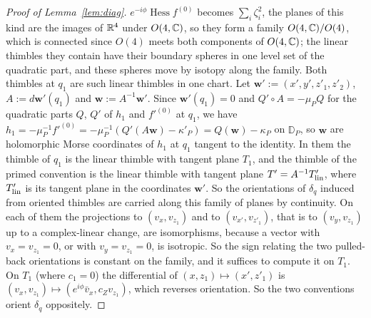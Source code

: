 \begin{proof}[Proof of Lemma~\ref{lem:diag}]
$e^{-i\phi}\operatorname{Hess}f^{(0)}$ becomes $\sum_i\zeta_i^2$, the planes of this kind are the images of $\mathbb R^4$ under
$O(4,\mathbb C)$, so they form a family $O(4,\mathbb C)/O(4)$, which is connected since $O(4)$ meets both components of $O(4,\mathbb C)$; the linear thimbles they contain have their boundary spheres
in one level set of the quadratic part, and these spheres move by isotopy along the family. Both thimbles at $q_1$ are
such linear thimbles in one chart. Let $\mathbf w':=(x',y',z'_1,z'_2)$, $A:=d\mathbf w'(q_1)$ and $\mathbf w:=A^{-1}\mathbf w'$.
Since $\mathbf w'(q_1)=0$ and $Q'\circ A=-\mu_PQ$ for the quadratic parts $Q$, $Q'$ of $h_1$ and $f'^{(0)}$ at $q_1$, we have
$h_1=-\mu_P^{-1}f'^{(0)}=-\mu_P^{-1}(Q'(A\mathbf w)-\kappa'_P)=Q(\mathbf w)-\kappa_P$ on $\mathbb D_P$, so $\mathbf w$ are
holomorphic Morse coordinates of $h_1$ at $q_1$ tangent to the identity. In them the thimble of $q_1$ is the linear thimble
with tangent plane $T_1$, and the thimble of the primed convention is the linear thimble with tangent plane
$T'=A^{-1}T'_{\rm lin}$, where $T'_{\rm lin}$ is its tangent plane in the coordinates $\mathbf w'$. So the orientations of $\delta_q$ induced
from oriented thimbles are carried along this family of planes by continuity. On each of them the projections to $(v_x,v_{z_1})$ and to $(v_{x'},v_{z'_1})$, that is to
$(v_y,v_{z_1})$ up to a complex-linear change, are isomorphisms, because a vector with $v_x=v_{z_1}=0$, or with
$v_y=v_{z_1}=0$, is isotropic. So the sign relating the two pulled-back orientations is constant on the family, and it
suffices to compute it on $T_1$. On $T_1$ (where $c_1=0$) the differential of
$(x,z_1)\mapsto(x',z'_1)$ is $(v_x,v_{z_1})\mapsto(e^{i\phi}\bar v_x,c_Zv_{z_1})$, which reverses orientation. So the two
conventions orient $\delta_q$ oppositely.
\end{proof}

